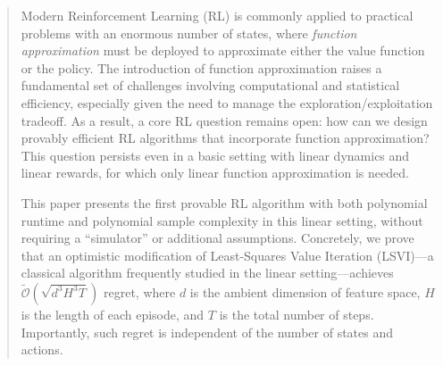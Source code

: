 \documentclass[11pt]{article}
\theoremstyle{definition}
\let\tilde\widetilde
\begin{document}
\begin{abstract}
Modern Reinforcement Learning (RL) is commonly applied to practical problems with an enormous number of states, where \emph{function approximation} must be deployed to approximate either the value function or the policy. The introduction of function approximation raises a fundamental set of challenges involving computational and statistical efficiency, especially given the need to manage the exploration/exploitation tradeoff. As a result, a core RL question remains open: how can we design provably efficient RL algorithms that incorporate function approximation? This question persists even in a basic setting with linear dynamics and linear rewards, for which only linear function approximation is needed. 




This paper presents the first provable RL algorithm with both polynomial runtime and polynomial sample complexity in this linear setting,
without requiring a ``simulator'' or additional assumptions. Concretely, we prove that an optimistic modification of Least-Squares Value Iteration (LSVI)---a classical algorithm frequently studied in the linear setting---achieves $\tilde{\mathcal{O}}(\sqrt{d^3H^3T})$ regret, where $d$ is the ambient dimension of feature space, $H$ is the length of each episode, and $T$ is the total number of steps. Importantly, such regret is independent of the number of states and actions.

\end{abstract}
\end{document}
